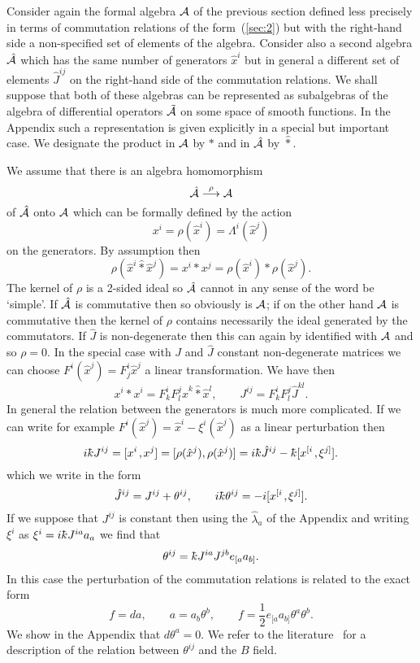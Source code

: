 \documentclass[a4paper,12pt]{article}
\def\h#1{\hat #1}
\def\t#1{\tilde #1}
\def\c#1{{\cal #1}}
\def\kbar{{\mathchar'26\mkern-9muk}}
\def\t#1{\tilde #1}
\def\wm{\mathbin{*}}
\def\hwm{\mathbin{\hat *}}
\def\k{\kern-.1em\mathbin{,}\kern-.1em}
\begin{document}
Consider again the formal algebra $\c{A}$ of the previous section
defined less precisely in terms of commutation relations of the
form~(\ref{sec:2}) but with the right-hand side a non-specified set of
elements of the algebra. Consider also a second algebra $\h{\c}{A}$
which has the same number of generators $\h{x}^i$ but in general a
different set of elements $\h{J}^{ij}$ on the right-hand side of the
commutation relations. We shall suppose that both of these algebras
can be represented as subalgebras of the algebra of differential
operators $\t{\c}{A}$ on some space of smooth functions. In the
Appendix such a representation is given explicitly in a special but
important case. We designate the product in $\c{A}$ by $*$ and in
$\h{\c}{A}$ by $\hat *$.

We assume that there is an algebra homomorphism
\begin{equation}
\h{\c}{A} \buildrel \rho \over \longrightarrow \c{A}      \label{sec:5}
\end{equation}
of $\h{\c}{A}$ onto $\c{A}$ which can be formally defined by the action
$$
x^i = \rho (\h{x}^i) = \Lambda^i(\h{x}^j)
$$
on the generators. By assumption then
\begin{equation}
\rho(\h{x}^i \hwm \h{x}^j) = x^i \wm x^j = 
\rho(\h{x}^i) \wm \rho(\h{x}^j).                      \label{cop}
\end{equation}
The kernel of $\rho$ is a 2-sided ideal so $\h{\c}{A}$ cannot in any
sense of the word be `simple'. If $\h{\c}{A}$ is commutative then so
obviously is $\c{A}$; if on the other hand $\c{A}$ is commutative then
the kernel of $\rho$ contains necessarily the ideal generated by the
commutators. If $\h{J}$ is non-degenerate then this can again by
identified with $\c{A}$ and so $\rho = 0$.  In the special case with
$J$ and $\h{J}$ constant non-degenerate matrices we can choose
$F^i(\h{x}^j) = F^i_j \h{x}^j$ a linear transformation.
We have then
$$
x^i \wm x^i = F^i_k F^j_l \h{x}^k \hwm \h{x}^l, \qquad
J^{ij} = F^i_k F^j_l \h{J}^{kl}.
$$
In general the relation between the generators is much more
complicated. If we can write for example 
$F^i(\h{x}^j) = \h{x}^i - \xi^i(\h{x}^j)$ as a linear 
perturbation then
$$
i \kbar J^{ij} = [x^i \k x^j] = 
[\rho(\h{x}^j), \rho(\h{x}^j)] =
i \kbar \h{J}^{ij} - \kbar [x^{[i} \k \xi^{j]}].
$$
which we write in the form
\begin{equation}
\h{J}^{ij} = J^{ij} + \theta^{ij}, \qquad 
i \kbar \theta^{ij} = - i [x^{[i}\k \xi^{j]}].              \label{theta}
\end{equation}
If we suppose that $J^{ij}$ is constant then using the $\h{\lambda}_a$ of
the Appendix and writing $\xi^i$ as $\xi^i = i\kbar J^{ia} a_a$ we find that
$$
\theta^{ij} =  \kbar J^{ia} J^{jb} e_{[a} a_{b]}.
$$
In this case the perturbation of the commutation relations is related to
the exact form 
$$
f = da, \qquad a = a_b \theta^b, \qquad 
f = \frac 12 e_{[a} a_{b]} \theta^a \theta^b.
$$
We show in the Appendix that $d\theta^a = 0$. We refer to the
literature~\cite{Sch99} for a description of the relation between
$\theta^{ij}$ and the $B$ field.
\end{document}
